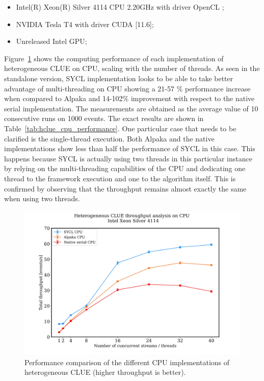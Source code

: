 \begin{itemize}
    \item Intel(R) Xeon(R) Silver 4114 CPU 2.20GHz with driver OpenCL \newline [2022.14.7.0.30\textunderscore160000];
    \item NVIDIA Tesla T4 with driver CUDA [11.6];
    \item Unreleased Intel GPU;
\end{itemize} 

Figure~\ref{fig:hclue_cpu_performance} shows the computing performance of each implementation of heterogeneous CLUE on CPU, scaling with the number of threads. As seen in the standalone version, SYCL implementation looks to be able to take better advantage of multi-threading on CPU showing a 21-57 \% performance increase when compared to Alpaka and 14-102\% improvement with respect to the native serial implementation. The measurements are obtained as the average value of 10 consecutive runs on 1000 events. The exact results are shown in Table~\ref{tab:hclue_cpu_performance}. One particular case that needs to be clarified is the single-thread execution. Both Alpaka and the native implementations show less than half the performance of SYCL in this case. This happens because SYCL is actually using two threads in this particular instance by relying on the multi-threading capabilities of the CPU and dedicating one thread to the framework execution and one to the algorithm itself. This is confirmed by observing that the throughput remains almost exactly the same when using two threads.

\begin{figure}[H]
    \centering
    \includegraphics[width=\textwidth]{media/hclue_cpu_performance.jpg}
    \caption{Performance comparison of the different CPU implementations of heterogeneous CLUE (higher throughput is better).}
    \label{fig:hclue_cpu_performance}
\end{figure}


